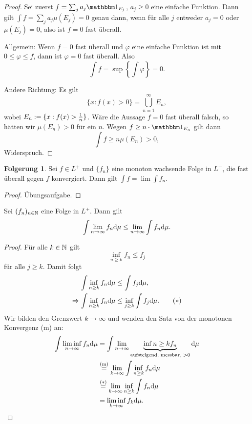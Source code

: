 \documentclass[
 a4paper,
 12pt,
 parskip=half
 ]{scrreprt}
\theoremstyle{plain}
\theoremstyle{definition}
\newtheorem{folg}[thm]{Folgerung}
\numberwithin{equation}{section}
\begin{document}
\begin{proof}
 Sei zuerst $f = \sum_j a_j \ind_{E_j}$, $a_j \ge 0$ eine einfache Funktion. Dann gilt $\int f = \sum_j a_j \mu( E_j ) = 0$ genau dann, wenn für alle $j$ entweder $a_j = 0$ oder $\mu( E_j ) = 0$, also ist $f = 0$ fast überall.
 
 Allgemein: Wenn $f=0$ fast überall und $\varphi$ eine einfache Funktion ist mit $0 \le \varphi \le f$, dann ist $\varphi = 0$ fast überall. Also
 \[ \int f = \sup \left\{ \int \varphi \right\} = 0. \]
 
 Andere Richtung: Es gilt
 \[ \{ x : f(x) > 0 \} = \bigcup_{n=1}^\infty E_n, \]
 wobei $E_n := \{ x : f(x) > \frac{1}{n} \}$. Wäre die Aussage $f=0$ fast überall falsch, so hätten wir $\mu(E_n) > 0$ für ein $n$. Wegen $f \ge n \cdot \ind_{E_n}$ gilt dann 
 \[ \int f \ge n \mu( E_n ) > 0, \]
 Widerspruch.
\end{proof}

\begin{folg}
 Sei $f \in L^+$ und $\{ f_n\}$ eine monoton wachsende Folge in $L^+$, die fast überall gegen $f$ konvergiert. Dann gilt $\int f = \lim \int f_n.$
\end{folg}

\begin{proof}
 Übungsaufgabe.
\end{proof}

\begin{thm}
 Sei $(f_n)_{n \in \mathbb{N}}$ eine Folge in $L^+$. Dann gilt
 \[ \int \lim_{n \to \infty} f_n \mathrm{d} \mu \le \lim_{n \to \infty} \int f_n \mathrm{d} \mu. \]
\end{thm}

\begin{proof}
 Für alle $k \in \mathbb{N}$ gilt
 \[ \inf_{n \ge k} f_n \le f_j \]
 für alle $j \ge k$. Damit folgt 
 \begin{align*}
     \int \inf_{n \ge k} f_n \mathrm{d} \mu &\le \int f_j \mathrm{d} \mu, \\
     \Rightarrow \int \inf_{n \ge k} f_n \mathrm{d} \mu &\le \inf_{j \ge k} \int f_j \mathrm{d} \mu. \tag{$*$}
 \end{align*}
 Wir bilden den Grenzwert $k \to \infty$ und wenden den Satz von der monotonen Konvergenz (m) an:
 \begin{align*}
     \int \liminf_{n \to \infty} f_n \mathrm{d} \mu &= \int \lim_{n \to \infty} \underbrace{\inf{n \ge k} f_n}_{\text{aufsteigend, messbar, } > 0} \mathrm{d} \mu \\
     &\overset{(\text{m})}{=} \lim_{k \to \infty} \int \inf_{n \ge k} f_n \mathrm{d} \mu \\
     &\overset{(*)}{=} \lim_{k \to \infty} \inf_{n \ge k} \int f_n \mathrm{d} \mu \\
     &= \liminf_{k \to \infty} f_k \mathrm{d} \mu. \qedhere
 \end{align*}
\end{proof}
\end{document}
